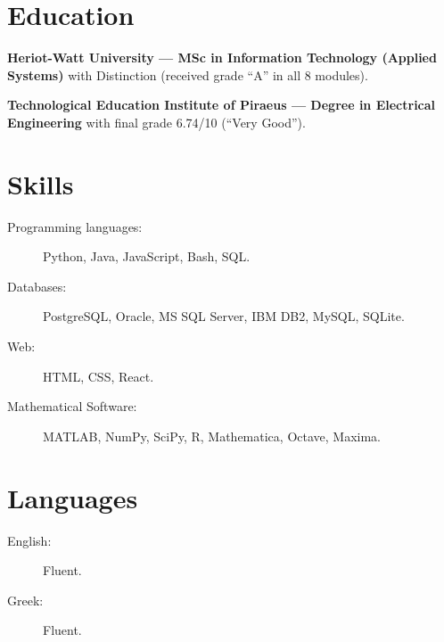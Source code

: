 \documentclass [a4paper,11pt]{article}
\begin{document}
	\section* {Education}
		\begin {description}
		\parindent=20pt

            \item \textbf{Heriot-Watt University --- MSc in
            Information Technology (Applied Systems)} with Distinction
            (received grade ``A'' in all 8 modules). 

            \item \textbf{Technological Education Institute of
            Piraeus --- Degree in Electrical Engineering} with final
            grade 6.74/10 (``Very Good'').
		 \end {description}
	
	\section* {Skills}
		\begin {description}
			\item [Programming languages:] Python, Java, JavaScript, Bash, SQL.
			\item [Databases:] PostgreSQL, Oracle, MS SQL Server, IBM DB2, MySQL, SQLite.
			\item [Web:] HTML, CSS, React.
			\item [Mathematical Software:] MATLAB, NumPy, SciPy, R, Mathematica, Octave, Maxima.
		\end {description}

    \section* {Languages}
        \begin {description}
            \item [English:] Fluent.
            \item [Greek:] Fluent.
        \end {description}
\end{document}
